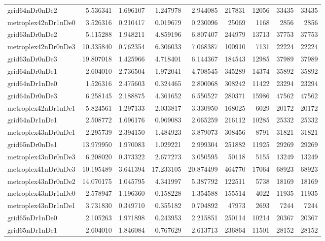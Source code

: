 \documentclass[../../../thesis.tex]{subfiles}
\begin{document}
\begin{longtable}{|l|r|r|r|r|r|r|r|r|}
grid64nDr0nDe2 & 5.536341 & 1.696107 & 1.247978 & 2.944085 & 217831 & 12056 & 33435 & 33435 \\
metroplex42nDr1nDe0 & 3.526316 & 0.210417 & 0.019679 & 0.230096 & 25069 & 1168 & 2856 & 2856 \\
grid63nDr0nDe2 & 5.115288 & 1.948211 & 4.859196 & 6.807407 & 244979 & 13713 & 37753 & 37753 \\
metroplex42nDr0nDe3 & 10.335840 & 0.762354 & 6.306033 & 7.068387 & 100910 & 7131 & 22224 & 22224 \\
grid63nDr0nDe3 & 19.807018 & 1.425966 & 4.718401 & 6.144367 & 184543 & 12985 & 37989 & 37989 \\
grid64nDr0nDe1 & 2.604010 & 2.736504 & 1.972041 & 4.708545 & 345289 & 14374 & 35892 & 35892 \\
grid64nDr1nDe0 & 1.526316 & 2.475603 & 0.324465 & 2.800068 & 308242 & 11422 & 23294 & 23294 \\
grid64nDr0nDe3 & 6.258145 & 2.188875 & 4.361652 & 6.550527 & 280371 & 15986 & 47562 & 47562 \\
metroplex42nDr1nDe1 & 5.824561 & 1.297133 & 2.033817 & 3.330950 & 168025 & 6029 & 20172 & 20172 \\
grid64nDr1nDe1 & 2.508772 & 1.696176 & 0.969083 & 2.665259 & 216112 & 10285 & 25332 & 25332 \\
metroplex43nDr0nDe1 & 2.295739 & 2.394150 & 1.484923 & 3.879073 & 308456 & 8791 & 31821 & 31821 \\
grid65nDr0nDe1 & 13.979950 & 1.970083 & 1.029221 & 2.999304 & 251882 & 11925 & 29269 & 29269 \\
metroplex43nDr0nDe3 & 6.208020 & 0.373322 & 2.677273 & 3.050595 & 50118 & 5155 & 13249 & 13249 \\
metroplex41nDr0nDe3 & 10.195489 & 3.641394 & 17.233105 & 20.874499 & 464770 & 17064 & 68923 & 68923 \\
metroplex43nDr0nDe2 & 14.070175 & 1.045795 & 4.341997 & 5.387792 & 122511 & 5738 & 18169 & 18169 \\
metroplex43nDr1nDe0 & 2.578947 & 1.196360 & 0.158228 & 1.354588 & 155514 & 4022 & 11935 & 11935 \\
metroplex43nDr1nDe1 & 3.731830 & 0.349710 & 0.355182 & 0.704892 & 47973 & 2693 & 7244 & 7244 \\
grid65nDr1nDe0 & 2.105263 & 1.971898 & 0.243953 & 2.215851 & 250114 & 10214 & 20367 & 20367 \\
grid65nDr1nDe1 & 2.604010 & 1.846084 & 0.767629 & 2.613713 & 236864 & 11501 & 28152 & 28152 \\

\end{longtable}
\end{document}

